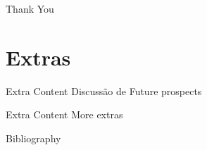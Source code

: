 \documentclass[serif, aspectratio=169]{beamer}
\begin{document}
\begin{frame}
    \begin{center}
        {\Huge\calligra Thank You}
    \end{center}
\end{frame}

\section*{Extras}

\begin{frame}{Extra Content}
    Discussão de Future prospects
\end{frame}

\begin{frame}{Extra Content}
	More extras
\end{frame}

\begin{frame}[allowframebreaks]{Bibliography}
\printbibliography
\end{frame}
\end{document}
